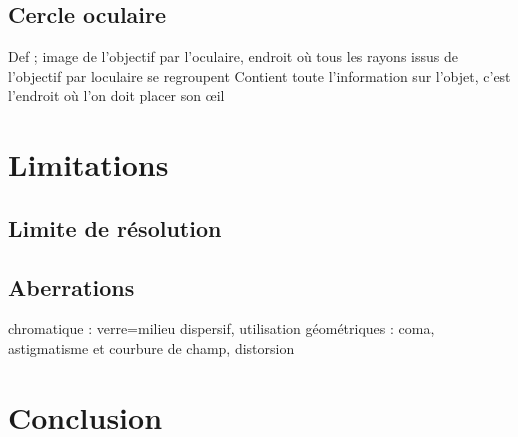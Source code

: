 \subsection{Cercle oculaire}
Def ; image de l'objectif par l'oculaire, endroit où tous les rayons issus de l'objectif par loculaire se regroupent
Contient toute l'information sur l'objet, c’est l’endroit où l'on doit placer son œil

\section{Limitations}
\subsection{Limite de résolution}
\subsection{Aberrations}
chromatique : verre=milieu dispersif, utilisation 
géométriques : coma, astigmatisme et courbure de champ, distorsion

%

%
%
%
%
%

\section*{Conclusion}


